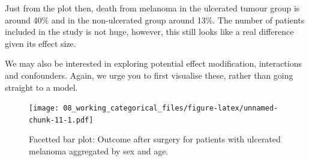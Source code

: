 \documentclass[
  12pt,
  krantz2]{krantz}
\makeatletter
\newenvironment{Shaded}{\begin{snugshade}}{\end{snugshade}}
\newcommand{\DataTypeTok}[1]{\textcolor[rgb]{0.13,0.29,0.53}{#1}}
\newcommand{\KeywordTok}[1]{\textcolor[rgb]{0.13,0.29,0.53}{\textbf{#1}}}
\newcommand{\NormalTok}[1]{#1}
\newcommand{\OperatorTok}[1]{\textcolor[rgb]{0.81,0.36,0.00}{\textbf{#1}}}
\newcommand{\OtherTok}[1]{\textcolor[rgb]{0.56,0.35,0.01}{#1}}
\newcommand{\StringTok}[1]{\textcolor[rgb]{0.31,0.60,0.02}{#1}}
\newenvironment{kframe}{%
\medskip{}
\setlength{\fboxsep}{.8em}
 \def\at@end@of@kframe{}%
 \ifinner\ifhmode%
  \def\at@end@of@kframe{\end{minipage}}%
  \begin{minipage}{\columnwidth}%
 \fi\fi%
 \def\FrameCommand##1{\hskip\@totalleftmargin \hskip-\fboxsep
 \colorbox{shadecolor}{##1}\hskip-\fboxsep
     \hskip-\linewidth \hskip-\@totalleftmargin \hskip\columnwidth}%
 \MakeFramed {\advance\hsize-\width
   \@totalleftmargin\z@ \linewidth\hsize
   \@setminipage}}%
 {\par\unskip\endMakeFramed%
 \at@end@of@kframe}
\renewenvironment{Shaded}{\begin{kframe}}{\end{kframe}}
\makeatother
\begin{document}
Just from the plot then, death from melanoma in the ulcerated tumour group is around 40\% and in the non-ulcerated group around 13\%.
The number of patients included in the study is not huge, however, this still looks like a real difference given its effect size.

We may also be interested in exploring potential effect modification, interactions and confounders.
Again, we urge you to first visualise these, rather than going straight to a model.

\begin{Shaded}
\end{Shaded}

\begin{figure}
\centering
\texttt{[image: 08\_working\_categorical\_files/figure-latex/unnamed-chunk-11-1.pdf]}
\caption{\label{fig:unnamed-chunk-11}Facetted bar plot: Outcome after surgery for patients with ulcerated melanoma aggregated by sex and age.}
\end{figure}
\end{document}
